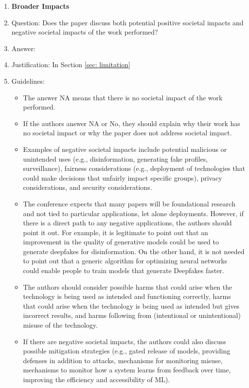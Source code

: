 \documentclass{article}
\begin{document}
\begin{enumerate}
\item {\bf Broader Impacts}
    \item[] Question: Does the paper discuss both potential positive societal impacts and negative societal impacts of the work performed?
    \item[] Answer: \answerYes{} %
    \item[] Justification: In Section \ref{sec: limitation}
    \item[] Guidelines:
    \begin{itemize}
        \item The answer NA means that there is no societal impact of the work performed.
        \item If the authors answer NA or No, they should explain why their work has no societal impact or why the paper does not address societal impact.
        \item Examples of negative societal impacts include potential malicious or unintended uses (e.g., disinformation, generating fake profiles, surveillance), fairness considerations (e.g., deployment of technologies that could make decisions that unfairly impact specific groups), privacy considerations, and security considerations.
        \item The conference expects that many papers will be foundational research and not tied to particular applications, let alone deployments. However, if there is a direct path to any negative applications, the authors should point it out. For example, it is legitimate to point out that an improvement in the quality of generative models could be used to generate deepfakes for disinformation. On the other hand, it is not needed to point out that a generic algorithm for optimizing neural networks could enable people to train models that generate Deepfakes faster.
        \item The authors should consider possible harms that could arise when the technology is being used as intended and functioning correctly, harms that could arise when the technology is being used as intended but gives incorrect results, and harms following from (intentional or unintentional) misuse of the technology.
        \item If there are negative societal impacts, the authors could also discuss possible mitigation strategies (e.g., gated release of models, providing defenses in addition to attacks, mechanisms for monitoring misuse, mechanisms to monitor how a system learns from feedback over time, improving the efficiency and accessibility of ML).
    \end{itemize}
    

\end{enumerate}
\end{document}
